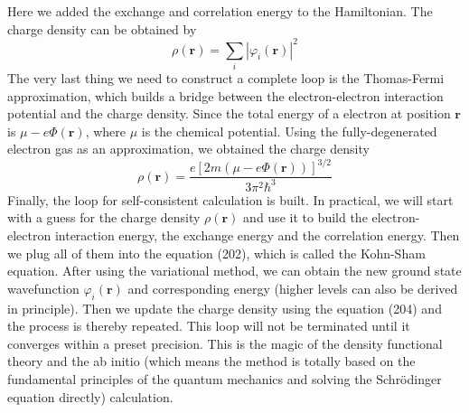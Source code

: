 \documentclass{article}
\begin{document}
\begin{equation}
\end{equation}Here we added the exchange and correlation energy to the Hamiltonian. The charge density can be obtained by\begin{equation}
    \rho(\mathbf{r})=\sum_{i}|\varphi_i(\mathbf{r})|^2
\end{equation}The very last thing we need to construct a complete loop is the Thomas-Fermi approximation, which builds a bridge between the electron-electron interaction potential and the charge density. Since the total energy of a electron at position $\mathbf{r}$ is $\mu-e\Phi(\mathbf{r})$, where $\mu$ is the chemical potential. Using the fully-degenerated electron gas as an approximation, we obtained the charge density\begin{equation}
    \rho(\mathbf{r})=\frac{e[2m(\mu-e\Phi(\mathbf{r}))]^{3/2}}{3\pi^2\hbar^3}
\end{equation}Finally, the loop for self-consistent calculation is built. In practical, we will start with a guess for the charge density $\rho(\mathbf{r})$ and use it to build the electron-electron interaction energy, the exchange energy and the correlation energy. Then we plug all of them into the equation (202), which is called the Kohn-Sham equation. After using the variational method, we can obtain the new ground state wavefunction $\varphi_i(\mathbf{r})$ and corresponding energy (higher levels can also be derived in principle). Then we update the charge density using the equation (204) and the process is thereby repeated. This loop will not be terminated until it converges within a preset precision. This is the magic of the density functional theory and the ab initio (which means the method is totally based on the fundamental principles of the quantum mechanics and solving the Schr\"odinger equation directly) calculation.
\end{document}
